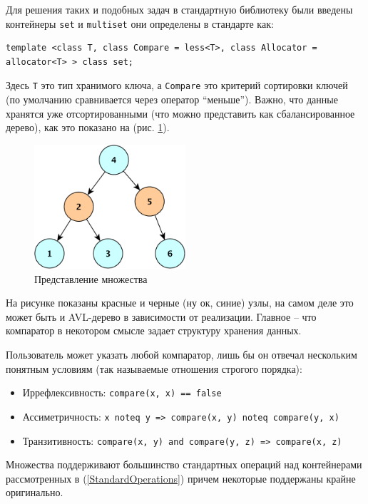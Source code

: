 \documentclass[a4paper,12pt,oneside]{article}
\begin{document}
Для решения таких и подобных задач в стандартную библиотеку были введены контейнеры \lstinline!set! и \lstinline!multiset! они определены в стандарте как:

\begin{lstlisting}
template <class T, class Compare = less<T>, class Allocator = allocator<T> > class set;
\end{lstlisting}

Здесь \lstinline!T! это тип хранимого ключа, а \lstinline!Compare! это критерий сортировки ключей (по умолчанию сравнивается через оператор ``меньше''). Важно, что данные хранятся уже отсортированными (что можно представить как сбалансированное дерево), как это показано на (рис. \ref{fig:sets}).

\begin{figure}[ht]
\centering
\includegraphics[width=0.5\textwidth]{illustrations/sets-crop.pdf}
\caption{Представление множества}
\label{fig:sets}
\end{figure}

На рисунке показаны красные и черные (ну ок, синие) узлы, на самом деле это может быть и AVL-дерево в зависимости от реализации. Главное -- что компаратор в некотором смысле задает структуру хранения данных.

Пользователь может указать любой компаратор, лишь бы он отвечал нескольким понятным условиям (так называемые отношения строгого порядка):

\begin {itemize}
\item Иррефлексивность: \lstinline!compare(x, x) == false!
\item Ассиметричность: \lstinline!x noteq y => compare(x, y) noteq compare(y, x)!
\item Транзитивность: \lstinline!compare(x, y) and compare(y, z) => compare(x, z)!
\end {itemize}

Множества поддерживают большинство стандартных операций над контейнерами рассмотренных в (\ref{StandardOperations}) причем некоторые поддержаны крайне оригинально.
\end{document}
